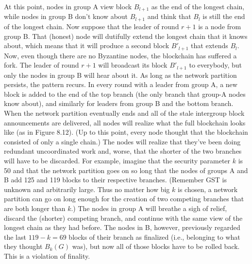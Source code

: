 At this point, nodes in group A view block $B_{l+1}$ as the end of the longest chain, while
nodes in group B don’t know about $B_{l+1}$ and think that $B_l$
is still the end of the longest
chain. Now suppose that the leader of round $r + 1$ is a node from group B. That (honest)
node will dutifully extend the longest chain that it knows about, which means that it will
produce a second block $B'_{l+1}$ that extends $B_l$. Now, even though there are no Byzantine
nodes, the blockchain has suffered a fork. The leader of round $r + 1$ will broadcast its
block $B'_{l+1}$ to everybody, but only the nodes in group B will hear about it. As long as the
network partition persists, the pattern recurs. In every round with a leader from group A, a
new block is added to the end of the top branch (the only branch that group-A nodes know
about), and similarly for leaders from group B and the bottom branch.
When the network partition eventually ends and all of the stale intergroup block announcements are delivered, all nodes will realize what the full blockchain looks like (as in
Figure 8.12). (Up to this point, every node thought that the blockchain consisted of only a
single chain.) The nodes will realize that they've been doing redundant uncoordinated work
and, worse, that the shorter of the two branches will have to be discarded.
For example, imagine that the security parameter $k$ is 50 and that the network partition
goes on so long that the nodes of groups A and B add 125 and 119 blocks to their respective
branches. (Remember GST is unknown and arbitrarily large. Thus no matter how big $k$ is chosen, a network partition can go on long enough for the creation of two competing branches
that are both longer than $k$.) The nodes in group A will breathe a sigh of relief, discard the
(shorter) competing branch, and continue with the same view of the longest chain as they
had before. The nodes in B, however, previously regarded the last $119 - k = 69$ blocks of
their branch as finalized (i.e., belonging to what they thought $B_k(G)$ was), but now all of
those blocks have to be rolled back. This is a violation of finality.

